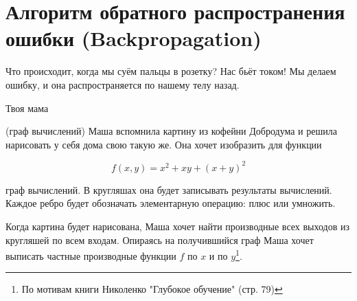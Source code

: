 
\section{Алгоритм обратного распространения ошибки (Backpropagation)}

\epigraph{Что происходит, когда мы суём пальцы в розетку? Нас бьёт током! Мы делаем ошибку, и она распространяется по нашему телу назад.}{Твоя мама}


\begin{problem}{(граф вычислений)}
    Маша вспомнила картину из кофейни Добродума и решила нарисовать у себя дома свою такую же. Она хочет изобразить для функции  
    
    $$
    f(x,y) = x^2 + xy + (x + y)^2
    $$ 
    
    граф вычислений. В кругляшах она будет записывать результаты вычислений. Каждое ребро будет обозначать элементарную операцию: плюс или умножить.
    
    Когда картина будет нарисована, Маша хочет найти производные всех выходов из кругляшей по всем входам. Опираясь на получившийся граф Маша хочет выписать частные производные функции $f$ по $x$ и по $y$\footnote{По мотивам книги Николенко "Глубокое обучение" (стр. 79)}.
\end{problem} 


